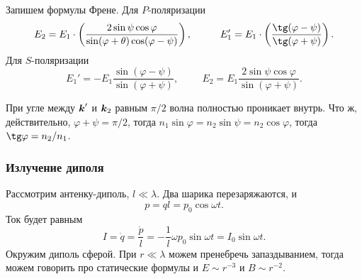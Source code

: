 
Запишем формулы Френе. Для $P$-поляризации
\begin{equation*}
    E_2 = E_1 \cdot \left(
        \frac{2 \sin \psi \cos \varphi}{\sin(\varphi + \theta)\cos (\varphi - \psi)} 
    \right),
    \hspace{1cm} 
    E_1' = E_1 \cdot \left(
    \frac{\tg(\varphi - \psi)}{\tg(\varphi + \psi)} 
    \right).
\end{equation*}
Для $S$-поляризации
\begin{equation*}
    E_1' = -E_1 \frac{\sin(\varphi-\psi)}{\sin(\varphi+\psi)},
    \hspace{1cm} 
    E_2 = E_1 \frac{2 \sin \psi \cos \varphi}{\sin(\varphi+\psi)}.
\end{equation*}

При угле между $\mbox{\boldmath $k$}'$ и $\mbox{\boldmath $k$}_2$ равным $\pi/2$ волна полностью проникает внутрь. 
Что ж, действительно, $\varphi + \psi = \pi/2$, тогда $n_1 \sin \varphi = n_2 \sin \psi = n_2 \cos \varphi$, тогда $\tg \varphi = n_2 / n_1$.


\subsubsection*{Излучение диполя}

Рассмотрим антенку-диполь, $l \ll \lambda$. Два шарика перезаряжаются, и 
\begin{equation*}
    p = ql = p_0 \cos \omega t.
\end{equation*}
Ток будет равным
\begin{equation*}
    I = \dot{q} = \frac{\dot{p}}{l} = -\frac{1}{l} \omega p_0 \sin \omega t =I_0 \sin \omega t 
    .
\end{equation*}
Окружим диполь сферой. При $r \ll \lambda$ можем пренебречь запаздыванием, тогда можем говорить про статические формулы и $E \sim r^{-3}$ и $B \sim r^{-2}$. 


